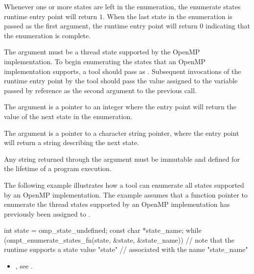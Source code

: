 Whenever one or more states are left in the enumeration,
the enumerate states runtime entry point will return $1$.
When the last state in the enumeration is passed
as the first argument, the runtime entry point will return $0$
indicating that the enumeration is complete.



\argdesc

The argument  must be a thread state
supported by the OpenMP implementation.  To begin enumerating the
states that an OpenMP implementation supports, a tool should pass
 as .  Subsequent
invocations of the runtime entry point by the tool should pass the
value assigned to the variable passed by reference as the second
argument to the previous call.

The argument  is a pointer to an integer where
the entry point will return the value of the next state in the
enumeration.

The argument  is a pointer to a
character string pointer, where the entry point will return a string
describing the next state.

\constraints
Any string returned through the argument
 must be immutable and defined
for the lifetime of a program execution.

\vspace{2ex}

\begin{note}
The following example illustrates how a tool can
enumerate all states supported by an OpenMP implementation.
The example assumes that a function pointer to enumerate
the thread states supported by an OpenMP implementation
has previously been assigned to .


\begin{ccppspecific}
\begin{omptOther}
int state = omp_state_undefined;
const char *state_name;
while (ompt_enumerate_states_fn(state, &state, &state_name)) {
  // note that the runtime supports a state value "state"
  // associated with the name "state_name"
}
\end{omptOther}
\end{ccppspecific}

\end{note}

\crossreferences
\begin{itemize}
\item {}, see .
\end{itemize}

